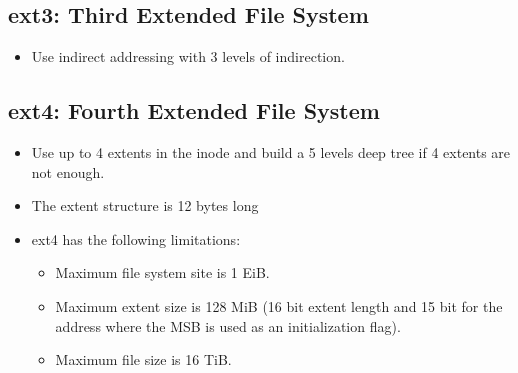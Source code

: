 \documentclass[a4paper, 11pt, accentcolor = tud3b]{tudreport}
\begin{document}
            \subsection{ext3: Third Extended File System}
                \begin{itemize}
                	\item Use indirect addressing with 3 levels of indirection.
                \end{itemize}
            

            \subsection{ext4: Fourth Extended File System}
                \begin{itemize}
                	\item Use up to 4 extents in the inode and build a 5 levels deep tree if 4 extents are not enough.
                	\item The extent structure is 12 bytes long
                	\item ext4 has the following limitations:
	                	\begin{itemize}
	                		\item Maximum file system site is 1 EiB.
	                		\item Maximum extent size is 128 MiB (16 bit extent length and 15 bit for the address where the MSB is used as an initialization flag).
	                		\item Maximum file size is 16 TiB.
	                	\end{itemize}
                \end{itemize}
\end{document}
